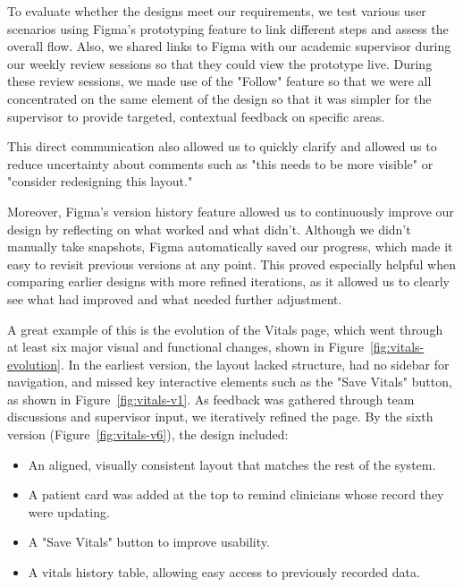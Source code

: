 To evaluate whether the designs meet our requirements, we test various user scenarios using Figma’s prototyping feature to link different steps and assess the overall flow. Also, we shared links to Figma with our academic supervisor during our weekly review sessions so that they could view the prototype live. During these review sessions, we made use of the "Follow" feature so that we were all concentrated on the same element of the design so that it was simpler for the supervisor to provide targeted, contextual feedback on specific areas.

This direct communication also allowed us to quickly clarify and allowed us to reduce uncertainty about comments such as "this needs to be more visible" or "consider redesigning this layout."

Moreover, Figma’s version history feature allowed us to continuously improve our design by reflecting on what worked and what didn’t. Although we didn’t manually take snapshots, Figma automatically saved our progress, which made it easy to revisit previous versions at any point. This proved especially helpful when comparing earlier designs with more refined iterations, as it allowed us to clearly see what had improved and what needed further adjustment.

A great example of this is the evolution of the Vitals page, which went through at least six major visual and functional changes, shown in Figure~\ref{fig:vitals-evolution}. In the earliest version, the layout lacked structure, had no sidebar for navigation, and missed key interactive elements such as the "Save Vitals" button, as shown in Figure~\ref{fig:vitals-v1}. As feedback was gathered through team discussions and supervisor input, we iteratively refined the page. By the sixth version (Figure~\ref{fig:vitals-v6}), the design included:

\begin{itemize}
    \item An aligned, visually consistent layout that matches the rest of the system.
    \item A patient card was added at the top to remind clinicians whose record they were updating.
    \item A "Save Vitals" button to improve usability.
    \item A vitals history table, allowing easy access to previously recorded data.
\end{itemize}

